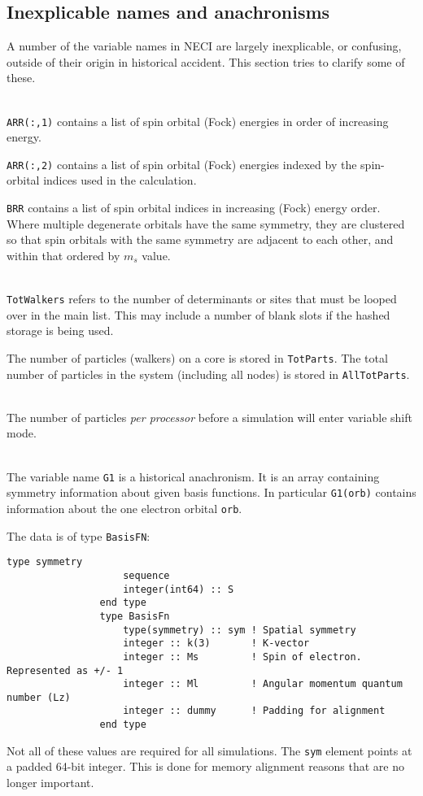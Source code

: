 \documentclass[a4paper,notitlepage]{scrreprt}
\newcommand\headitem[1]{\needspace{1.5\baselineskip}\item[{\boldmath #1 \nopagebreak}] \hfill \\ \nopagebreak}
\let\code\lstinline
\begin{document}
\subsection{Inexplicable names and anachronisms}
	A number of the variable names in NECI are largely inexplicable, or
	confusing, outside of their origin in historical accident. This section
	tries to clarify some of these.

	\begin{description}
		\headitem{ARR, BRR}
			\code{ARR(:,1)} contains a list of spin orbital (Fock)
			energies in	order of increasing energy.

			\code{ARR(:,2)} contains a list of spin orbital (Fock)
			energies indexed by the spin-orbital indices used in the
			calculation.

			\code{BRR} contains a list of spin orbital indices in
			increasing (Fock) energy order. Where multiple degenerate orbitals
			have the same symmetry, they are clustered so that spin orbitals
			with the same symmetry are adjacent to each other, and within that
			ordered by $m_s$ value.

		\headitem{TotWalkers and TotParts}
			\code{TotWalkers} refers to the number of determinants or
			sites that must be looped over in the main list. This may include
			a number of blank slots if the hashed storage is being used.

			The number of particles (walkers) on a core is stored in
			\code{TotParts}. The total number of particles in the system
			(including all nodes) is stored in \code{AllTotParts}.

		\headitem{InitWalkers}
			The number of particles \emph{per processor} before a simulation
			will enter variable shift mode.

		\headitem{G1}
			The variable name \code{G1} is a historical anachronism. It
			is an array containing symmetry information about given basis
			functions. In particular \code{G1(orb)} contains information
			about the one electron orbital \code{orb}.

			The data is of type \code{BasisFN}:
			\begin{lstlisting}[gobble=12]
				type symmetry
					sequence
					integer(int64) :: S
				end type
				type BasisFn
					type(symmetry) :: sym ! Spatial symmetry 
					integer :: k(3)       ! K-vector
					integer :: Ms         ! Spin of electron. Represented as +/- 1
					integer :: Ml         ! Angular momentum quantum number (Lz)
					integer :: dummy      ! Padding for alignment
				end type
			\end{lstlisting}
			Not all of these values are required for all simulations. The
			\code{sym} element points at a padded 64-bit integer. This
			is done for memory alignment reasons that are no longer important.
	\end{description}
\end{document}
